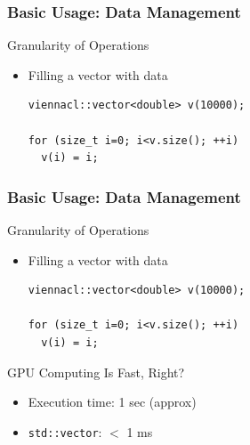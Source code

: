 \begin{frame}[fragile]
\frametitle{Basic Usage: Data Management}
 \begin{block}{Granularity of Operations}
  \begin{itemize}
   \item Filling a vector with data
   \begin{lstlisting}
viennacl::vector<double> v(10000);

for (size_t i=0; i<v.size(); ++i)
  v(i) = i;    
   \end{lstlisting}
  \end{itemize}
 \end{block}


\end{frame}


\begin{frame}[fragile]
\frametitle{Basic Usage: Data Management}
 \begin{block}{Granularity of Operations}
  \begin{itemize}
   \item Filling a vector with data
   \begin{lstlisting}
viennacl::vector<double> v(10000);

for (size_t i=0; i<v.size(); ++i)
  v(i) = i;    
   \end{lstlisting}
  \end{itemize}
 \end{block}

 \begin{block}{GPU Computing Is Fast, Right?}
  \begin{itemize}
   \item Execution time: 1 sec (approx)
   \item \texttt{std::vector}: $<$ 1 ms
  \end{itemize}

 \end{block}

 \vspace*{2.5cm}

\end{frame}

